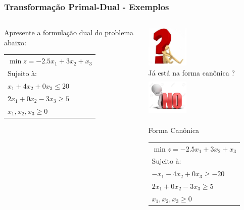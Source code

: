 \documentclass{beamer}
\begin{document}
\begin{frame}
	\frametitle{Transformação Primal-Dual - Exemplos}
	\begin{columns}
		\begin{column}{5cm}
			\begin{block}{Apresente a formulação dual do problema abaixo:}
				\begin{table}
					\begin{tabular}{l}
						$ \min z = -2.5x_1 + 3x_2 + x_3$ \\
						Sujeito à: \\
						$x_1 + 4x_2 + 0x_3 \le 20$ \\
						$2x_1 + 0x_2 - 3x_3 \ge 5$ \\
						$x_1, x_2, x_3 \ge 0$ \\
					\end{tabular}
				\end{table}
			\end{block}
		\end{column}
		\begin{column}{6cm}
			\centering
			\only<1-2>
			{
				\includegraphics[width=2cm,height=2cm]{duvida.jpg} \\
			}
			\only<2-3>
			{
				{\Large  \color{red}Já está na forma canônica ?}
			}
			\only<3>
			{
			\includegraphics[width=2cm,height=2cm]{nao.jpg} \\
			}	
			\only<4>
			{
				\begin{exampleblock}{Forma Canônica}
					\begin{table}
						\begin{tabular}{l}
							$ \min z = -2.5x_1 + 3x_2 + x_3$ \\
							Sujeito à: \\
							$-x_1 - 4x_2 + 0x_3 \ge -20$ \\
							$2x_1 + 0x_2 - 3x_3 \ge 5$ \\
							$x_1, x_2, x_3 \ge 0$ \\
						\end{tabular}
					\end{table}

\end{exampleblock}}
\end{column}
\end{columns}
\end{frame}
\end{document}
